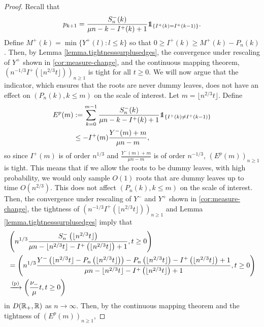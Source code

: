 \begin{proof}
Recall that
$$p_{k+1}=\frac{S_n^{-}(k)}{\mu n - k -I^{+}(k)+1}\one_{\{I^{+}(k)=I^{+}(k-1)\}}.$$
Define $M^+(k)=\min\{Y^+(l):l\leq k\}$ so that $0\geq I^{+}(k)\geq M^+(k)-P_n(k)$.  Then, by Lemma \ref{lemma.tightnesssurplusedges}, the convergence under rescaling of $Y^+$ shown in \cref{cor:measure-change}, and the continuous mapping theorem, $\left(n^{-1/3}I^+(\lfloor n^{2/3} t \rfloor)\right)_{n\geq 1}$ is tight for all $t\geq 0$.
We will now argue that the indicator, which ensures that the roots are never dummy leaves, does not have an effect on $(P_n(k),k\leq m)$ on the scale of interest. Let $m=\lfloor n^{2/3}t\rfloor$. Define
\begin{align*}\begin{split}
E^p(m)&:=\sum_{k=0}^{m-1}\frac{S_n^{-}(k)}{\mu n - k -I^{+}(k)+1}\one_{\{I^{+}(k)\neq I^{+}(k-1)\}}\\
&\leq -I^{+}(m) \frac{Y^-(m)+m}{\mu n - m},\end{split}\end{align*}
so since $I^{+}(m)$ is of order $n^{1/3}$ and $\frac{Y^{-}(m)+m}{\mu n - m}$ is of order $n^{-1/3}$, $(E^p(m))_{n\geq 1}$ is tight.  This means that if we allow the roots to be dummy leaves, with high probability, we would only sample $O(1)$ roots that are dummy leaves up to time $O(n^{2/3})$. This does not affect $(P_n(k),k\leq m)$ on the scale of interest. \\
 Then, the convergence under rescaling of $Y^-$ and $Y^+$ shown in \cref{cor:measure-change}, the tightness of $\left(n^{-1/3}I^{+}(\lfloor n^{2/3} t \rfloor)\right)_{n\geq 1}$ and Lemma \ref{lemma.tightnesssurplusedges} imply that
\begin{align}\begin{split}\label{eq.convergenceprob}
  &\left(n^{1/3}\frac{S_n^{-}\left(\lfloor n^{2/3} t \rfloor\right)}{\mu n - \lfloor n^{2/3} t \rfloor -I^{+}\left(\lfloor n^{2/3} t \rfloor\right)+1},t\geq 0\right)\\
 &=\left(n^{1/3}\frac{Y^-\left(\lfloor n^{2/3} t \rfloor-P_n\left(\lfloor n^{2/3} t \rfloor\right)\right)-P_n\left(\lfloor n^{2/3} t \rfloor\right)-I^{+}\left(\lfloor n^{2/3} t \rfloor\right)+1}{\mu n - \lfloor n^{2/3} t \rfloor -I^{+}\left(\lfloor n^{2/3} t \rfloor\right)+1},t\geq 0\right)\\
 &\xrightarrow[]{\mathrm{(p)}} \left(\frac{\nu_-}{\mu}t,t\geq 0\right)\end{split}\end{align}
in $D({\mathbb R}_+,{\mathbb R})$ as $n\to \infty$. 
Then, by the continuous mapping theorem and the tightness of $(E^p(m))_{n\geq 1}$,

\end{proof}
